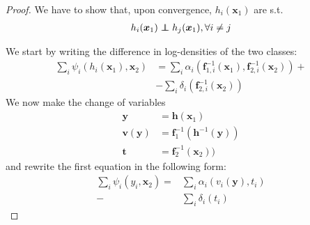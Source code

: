 \begin{proof}
	We have to
	show that, upon convergence, $h_{i}(\bm{x}_{1})$ are s.t.
	\begin{align*}
	h_{i}(\bm{x}_{1})\independent h_{j}(\bm{x}_{1}),\forall i\neq j
	\end{align*}
	
	We start by writing the difference in log-densities of the two classes:
	\begin{align*}
	\sum_{i}\psi_{i}(h_{i}(\bm{x}_{1}),\bm{x}_{2})  &=\sum_{i}\alpha_{i}(\bm{f}_{1,i}^{-1}(\bm{x}_{1}), \bm{f}_{2,i}^{-1}(\bm{x}_{2}))+\\
	&-\sum_{i}\delta_{i}( \bm{f}_{2,i}^{-1}(\bm{x}_{2}))
	\end{align*}
	We now make the change of variables
	\begin{align*}
	\bm{y} & =\bm{h}(\bm{x}_{1})\\
	\bm{v}(\bm{y}) & =\bm{f}_{1}^{-1}(\bm{h}^{-1}(\bm{y}))\\
	\bm{t} & = \bm{f}_{2}^{-1}(\bm{x}_{2}))
	\end{align*}
	and rewrite the first equation in the following form:
	\begin{align}
	\sum_{i}\psi_{i}(y_{i},\bm{x}_{2})=&\sum_{i}\alpha_{i}(v_{i}(\bm{y}), t_{i})\\
	-&\sum_{i}\delta_{i}( t_{i})
	\end{align}
	

\end{proof}
